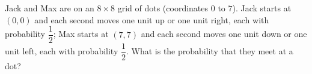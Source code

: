 Jack and Max are on an $8\times8$ grid of dots (coordinates $0$ to $7$). Jack starts at $(0,0)$ and each second moves one unit up or one unit right, each with probability $\dfrac{1}{2}$; Max starts at $(7,7)$ and each second moves one unit down or one unit left, each with probability $\dfrac{1}{2}$. What is the probability that they meet at a dot?
